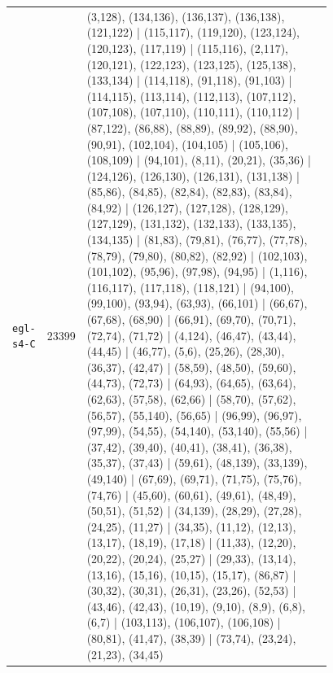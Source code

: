 \begin{landscape}
\begin{longtable}{lr>{\tiny\raggedright\arraybackslash}p{0.78\linewidth}}
\texttt{egl-s4-C} & 23399 & (3,128), (134,136), (136,137), (136,138), (121,122) | (115,117), (119,120), (123,124), (120,123), (117,119) | (115,116), (2,117), (120,121), (122,123), (123,125), (125,138), (133,134) | (114,118), (91,118), (91,103) | (114,115), (113,114), (112,113), (107,112), (107,108), (107,110), (110,111), (110,112) | (87,122), (86,88), (88,89), (89,92), (88,90), (90,91), (102,104), (104,105) | (105,106), (108,109) | (94,101), (8,11), (20,21), (35,36) | (124,126), (126,130), (126,131), (131,138) | (85,86), (84,85), (82,84), (82,83), (83,84), (84,92) | (126,127), (127,128), (128,129), (127,129), (131,132), (132,133), (133,135), (134,135) | (81,83), (79,81), (76,77), (77,78), (78,79), (79,80), (80,82), (82,92) | (102,103), (101,102), (95,96), (97,98), (94,95) | (1,116), (116,117), (117,118), (118,121) | (94,100), (99,100), (93,94), (63,93), (66,101) | (66,67), (67,68), (68,90) | (66,91), (69,70), (70,71), (72,74), (71,72) | (4,124), (46,47), (43,44), (44,45) | (46,77), (5,6), (25,26), (28,30), (36,37), (42,47) | (58,59), (48,50), (59,60), (44,73), (72,73) | (64,93), (64,65), (63,64), (62,63), (57,58), (62,66) | (58,70), (57,62), (56,57), (55,140), (56,65) | (96,99), (96,97), (97,99), (54,55), (54,140), (53,140), (55,56) | (37,42), (39,40), (40,41), (38,41), (36,38), (35,37), (37,43) | (59,61), (48,139), (33,139), (49,140) | (67,69), (69,71), (71,75), (75,76), (74,76) | (45,60), (60,61), (49,61), (48,49), (50,51), (51,52) | (34,139), (28,29), (27,28), (24,25), (11,27) | (34,35), (11,12), (12,13), (13,17), (18,19), (17,18) | (11,33), (12,20), (20,22), (20,24), (25,27) | (29,33), (13,14), (13,16), (15,16), (10,15), (15,17), (86,87) | (30,32), (30,31), (26,31), (23,26), (52,53) | (43,46), (42,43), (10,19), (9,10), (8,9), (6,8), (6,7) | (103,113), (106,107), (106,108) | (80,81), (41,47), (38,39) | (73,74), (23,24), (21,23), (34,45) \\[2pt]
\end{longtable}
\endgroup
\end{landscape}
\restoregeometry
